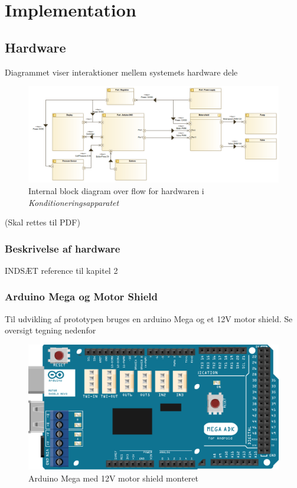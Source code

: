 \section{Implementation}

\subsection{Hardware}
Diagrammet viser interaktioner mellem systemets hardware dele \\
\begin{figure}[H]
	\includegraphics[width=\textwidth]{pdfs/InternalBlockdiagram(Hardware).png}
	\caption{Internal block diagram over flow for hardwaren i \textit{Konditioneringsapparatet}}
\end{figure}
(Skal rettes til PDF)

\subsubsection{Beskrivelse af hardware}
INDSÆT reference til kapitel 2

\subsubsection{Arduino Mega og Motor Shield}
Til udvikling af prototypen bruges en arduino Mega og et 12V motor shield. Se oversigt tegning nedenfor \\
\begin{figure}[H]
	\includegraphics[width=\textwidth]{pdfs/MegaPlusShield-crop.pdf}
	\caption{Arduino Mega med 12V motor shield monteret}
\end{figure}


